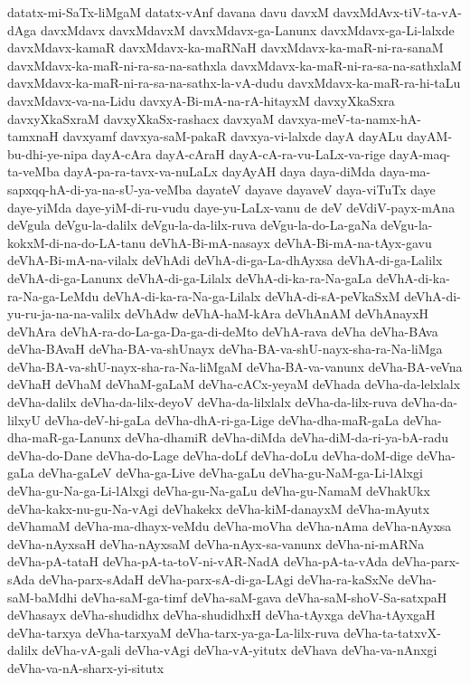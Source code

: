 {datatx-mi-SaTx-liMgaM
datatx-vAnf
davana
davu
davxM
davxMdAvx-tiV-ta-vA-dAga
davxMdavx
davxMdavxM
davxMdavx-ga-Lanunx
davxMdavx-ga-Li-lalxde
davxMdavx-kamaR
davxMdavx-ka-maRNaH
davxMdavx-ka-maR-ni-ra-sanaM
davxMdavx-ka-maR-ni-ra-sa-na-sathxla
davxMdavx-ka-maR-ni-ra-sa-na-sathxlaM
davxMdavx-ka-maR-ni-ra-sa-na-sathx-la-vA-dudu
davxMdavx-ka-maR-ra-hi-taLu
davxMdavx-va-na-Lidu
davxyA-Bi-mA-na-rA-hitayxM
davxyXkaSxra
davxyXkaSxraM
davxyXkaSx-rashacx
davxyaM
davxya-meV-ta-namx-hA-tamxnaH
davxyamf
davxya-saM-pakaR
davxya-vi-lalxde
dayA
dayALu
dayAM-bu-dhi-ye-nipa
dayA-cAra
dayA-cAraH
dayA-cA-ra-vu-LaLx-va-rige
dayA-maq-ta-veMba
dayA-pa-ra-tavx-va-nuLaLx
dayAyAH
daya
daya-diMda
daya-ma-sapxqq-hA-di-ya-na-sU-ya-veMba
dayateV
dayave
dayaveV
daya-viTuTx
daye
daye-yiMda
daye-yiM-di-ru-vudu
daye-yu-LaLx-vanu
de
deV
deVdiV-payx-mAna
deVgula
deVgu-la-dalilx
deVgu-la-da-lilx-ruva
deVgu-la-do-La-gaNa
deVgu-la-kokxM-di-na-do-LA-tanu
deVhA-Bi-mA-nasayx
deVhA-Bi-mA-na-tAyx-gavu
deVhA-Bi-mA-na-vilalx
deVhAdi
deVhA-di-ga-La-dhAyxsa
deVhA-di-ga-Lalilx
deVhA-di-ga-Lanunx
deVhA-di-ga-Lilalx
deVhA-di-ka-ra-Na-gaLa
deVhA-di-ka-ra-Na-ga-LeMdu
deVhA-di-ka-ra-Na-ga-Lilalx
deVhA-di-sA-peVkaSxM
deVhA-di-yu-ru-ja-na-na-valilx
deVhAdw
deVhA-haM-kAra
deVhAnAM
deVhAnayxH
deVhAra
deVhA-ra-do-La-ga-Da-ga-di-deMto
deVhA-rava
deVha
deVha-BAva
deVha-BAvaH
deVha-BA-va-shUnayx
deVha-BA-va-shU-nayx-sha-ra-Na-liMga
deVha-BA-va-shU-nayx-sha-ra-Na-liMgaM
deVha-BA-va-vanunx
deVha-BA-veVna
deVhaH
deVhaM
deVhaM-gaLaM
deVha-cACx-yeyaM
deVhada
deVha-da-lelxlalx
deVha-dalilx
deVha-da-lilx-deyoV
deVha-da-lilxlalx
deVha-da-lilx-ruva
deVha-da-lilxyU
deVha-deV-hi-gaLa
deVha-dhA-ri-ga-Lige
deVha-dha-maR-gaLa
deVha-dha-maR-ga-Lanunx
deVha-dhamiR
deVha-diMda
deVha-diM-da-ri-ya-bA-radu
deVha-do-Dane
deVha-do-Lage
deVha-doLf
deVha-doLu
deVha-doM-dige
deVha-gaLa
deVha-gaLeV
deVha-ga-Live
deVha-gaLu
deVha-gu-NaM-ga-Li-lAlxgi
deVha-gu-Na-ga-Li-lAlxgi
deVha-gu-Na-gaLu
deVha-gu-NamaM
deVhakUkx
deVha-kakx-nu-gu-Na-vAgi
deVhakekx
deVha-kiM-danayxM
deVha-mAyutx
deVhamaM
deVha-ma-dhayx-veMdu
deVha-moVha
deVha-nAma
deVha-nAyxsa
deVha-nAyxsaH
deVha-nAyxsaM
deVha-nAyx-sa-vanunx
deVha-ni-mARNa
deVha-pA-tataH
deVha-pA-ta-toV-ni-vAR-NadA
deVha-pA-ta-vAda
deVha-parx-sAda
deVha-parx-sAdaH
deVha-parx-sA-di-ga-LAgi
deVha-ra-kaSxNe
deVha-saM-baMdhi
deVha-saM-ga-timf
deVha-saM-gava
deVha-saM-shoV-Sa-satxpaH
deVhasayx
deVha-shudidhx
deVha-shudidhxH
deVha-tAyxga
deVha-tAyxgaH
deVha-tarxya
deVha-tarxyaM
deVha-tarx-ya-ga-La-lilx-ruva
deVha-ta-tatxvX-dalilx
deVha-vA-gali
deVha-vAgi
deVha-vA-yitutx
deVhava
deVha-va-nAnxgi
deVha-va-nA-sharx-yi-situtx
}
